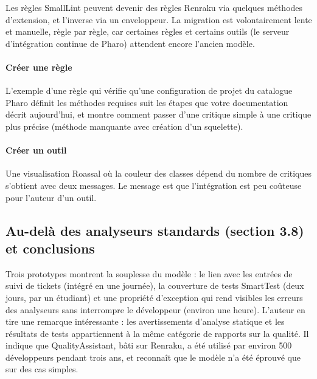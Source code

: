 \documentclass[11pt,a4paper]{article}
\begin{document}
Les règles SmallLint peuvent devenir des règles Renraku via quelques méthodes d’extension, et l’inverse via un enveloppeur. La migration est volontairement lente et manuelle, règle par règle, car certaines règles et certains outils (le serveur d’intégration continue de Pharo) attendent encore l’ancien modèle.

\paragraph{Créer une règle}

L’exemple d’une règle qui vérifie qu’une configuration de projet du catalogue Pharo définit les méthodes requises suit les étapes que votre documentation décrit aujourd’hui, et montre comment passer d’une critique simple à une critique plus précise (méthode manquante avec création d’un squelette).

\paragraph{Créer un outil}

Une visualisation Roassal où la couleur des classes dépend du nombre de critiques s’obtient avec deux messages. Le message est que l’intégration est peu coûteuse pour l’auteur d’un outil.

\subsection{Au-delà des analyseurs standards (section 3.8) et conclusions}

Trois prototypes montrent la souplesse du modèle : le lien avec les entrées de suivi de tickets (intégré en une journée), la couverture de tests SmartTest (deux jours, par un étudiant) et une propriété d’exception qui rend visibles les erreurs des analyseurs sans interrompre le développeur (environ une heure). L’auteur en tire une remarque intéressante : les avertissements d’analyse statique et les résultats de tests appartiennent à la même catégorie de rapports sur la qualité. Il indique que QualityAssistant, bâti sur Renraku, a été utilisé par environ 500 développeurs pendant trois ans, et reconnaît que le modèle n’a été éprouvé que sur des cas simples.
\end{document}
